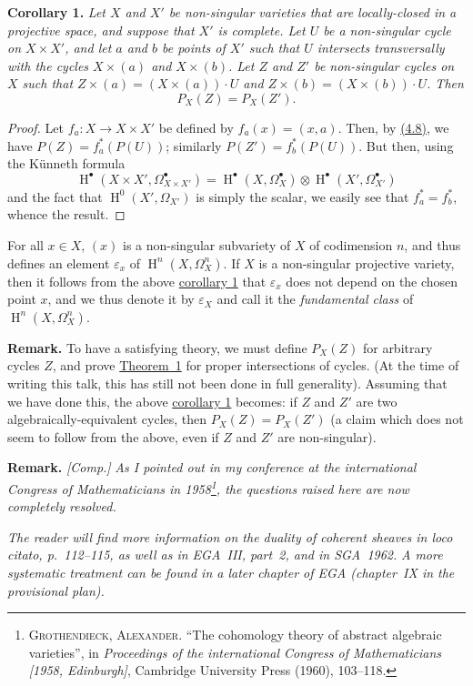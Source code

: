 \documentclass{article}
\newenvironment{itenv}[1]
  {\phantomsection\par\medskip\noindent\textbf{#1.}\itshape}
  {\par\medskip}
\newenvironment{rmenv}[1]
  {\phantomsection\par\medskip\noindent\textbf{#1.}\rmfamily}
  {\par\medskip}
\DeclareMathOperator{\HH}{H}
\newcommand{\oldpage}[1]{\marginpar{\footnotesize$\Big\vert$ \textit{p.~#1}}}
\begin{document}
\oldpage{149-13}
\begin{itenv}{Corollary 1}
\label{theorem1corollary1}
  Let $X$ and $X'$ be non-singular varieties that are locally-closed in a projective space, and suppose that $X'$ is complete.
  Let $U$ be a non-singular cycle on $X\times X'$, and let $a$ and $b$ be points of $X'$ such that $U$ intersects transversally with the cycles $X\times(a)$ and $X\times(b)$.
  Let $Z$ and $Z'$ be non-singular cycles on $X$ such that $Z\times(a)=(X\times(a))\cdot U$ and $Z\times(b)=(X\times(b))\cdot U$.
  Then
  \[
    P_X(Z) = P_X(Z').
  \]
\end{itenv}

\begin{proof}
  Let $f_a\colon X\to X\times X'$ be defined by $f_a(x)=(x,a)$.
  Then, by \hyperref[4.8]{(4.8)}, we have $P(Z)=f_a^*(P(U))$; similarly $P(Z')=f_b^*(P(U))$.
  But then, using the K\"{u}nneth formula
  \[
    \HH^\bullet(X\times X',\Omega_{X\times X'}^\bullet)
    = \HH^\bullet(X,\Omega_X^\bullet)\otimes\HH^\bullet(X',\Omega_{X'}^\bullet)
  \]
  and the fact that $\HH^0(X',\Omega_{X'})$ is simply the scalar, we easily see that $f_a^*=f_b^*$, whence the result.
\end{proof}

For all $x\in X$, $(x)$ is a non-singular subvariety of $X$ of codimension $n$, and thus defines an element $\varepsilon_x$ of $\HH^n(X,\Omega_X^n)$.
If $X$ is a non-singular projective variety, then it follows from the above \hyperref[theorem1corollary1]{corollary 1} that $\varepsilon_x$ does not depend on the chosen point $x$, and we thus denote it by $\varepsilon_X$ and call it the \emph{fundamental class} of $\HH^n(X,\Omega_X^n)$.

\begin{rmenv}{Remark}
\label{section4remark}
  To have a satisfying theory, we must define $P_X(Z)$ for arbitrary cycles $Z$, and prove \hyperref[theorem1]{Theorem~1} for proper intersections of cycles.
  (At the time of writing this talk, this has still not been done in full generality).
  Assuming that we have done this, the above \hyperref[theorem1corollary1]{corollary 1} becomes: if $Z$ and $Z'$ are two algebraically-equivalent cycles, then $P_X(Z)=P_X(Z')$ (a claim which does not seem to follow from the above, even if $Z$ and $Z'$ are non-singular).
\end{rmenv}

\begin{rmenv}{Remark}
  \emph{[Comp.]}
  \emph{As I pointed out in my conference at the international Congress of Mathematicians in 1958\footnote{\textsc{Grothendieck, Alexander.} ``The cohomology theory of abstract algebraic varieties'', in \emph{Proceedings of the international Congress of Mathematicians [1958, Edinburgh]}, Cambridge University Press (1960), 103--118.}, the questions raised here are now completely resolved.}

  \emph{The reader will find more information on the duality of coherent sheaves in \emph{loco citato}, p.~112--115, as well as in EGA~III, part~2, and in SGA~1962.}
  \emph{A more systematic treatment can be found in a later chapter of EGA (chapter~IX in the provisional plan).}
\end{rmenv}
\end{document}
